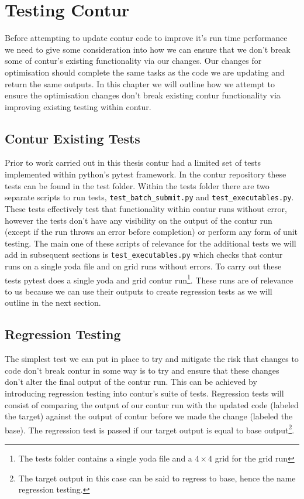 \chapter{Testing Contur}
\label{chapterlabel4}
Before attempting to update contur code to improve it's run time performance we need to give some consideration into how we can ensure that we don't break some of contur's existing functionality via our changes. Our changes for optimisation should complete the same tasks as the code we are updating and return the same outputs. In this chapter we will outline how we attempt to ensure the optimisation changes don't break existing contur functionality via improving existing testing within contur.

\section{Contur Existing Tests}
Prior to work carried out in this thesis contur had a limited set of tests implemented within python's pytest framework. In the contur repository these tests can be found in the test folder. Within the tests folder there are two separate scripts to run tests, \texttt{test\_batch\_submit.py} and \texttt{test\_executables.py}. These tests effectively test that functionality within contur runs without error, however the tests don't have any visibility on the output of the contur run (except if the run throws an error before completion) or perform any form of unit testing. The main one of these scripts of relevance for the additional tests we will add in subsequent sections is \texttt{test\_executables.py} which checks that contur runs on a single yoda file and on grid runs without errors. To carry out these tests pytest does a single yoda and grid contur run\footnote{The tests folder contains a single yoda file and a $4 \times 4$ grid for the grid run}. These runs are of relevance to us because we can use their outputs to create regression tests as we will outline in the next section.

\section{Regression Testing}
The simplest test we can put in place to try and mitigate the risk that changes to code don't break contur in some way is to try and ensure that these changes don't alter the final output of the contur run. This can be achieved by introducing regression testing into contur's suite of tests. Regression tests will consist of comparing the output of our contur run with the updated code (labeled the target) against the output of contur before we made the change (labeled the base). The regression test is passed if our target output is equal to base output\footnote{The target output in this case can be said to regress to base, hence the name regression testing.}. 

